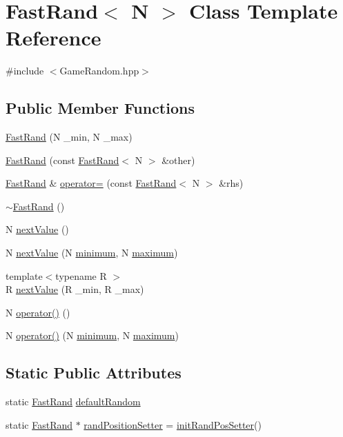 \hypertarget{class_fast_rand}{\section{Fast\-Rand$<$ N $>$ Class Template Reference}
\label{class_fast_rand}
}


{\ttfamily \#include $<$Game\-Random.\-hpp$>$}

\subsection*{Public Member Functions}
\begin{DoxyCompactItemize}
\item 
\hyperlink{class_fast_rand_a1b2acd69df1f8ebd670a133186042be4}{Fast\-Rand} (N \-\_\-min, N \-\_\-max)
\item 
\hyperlink{class_fast_rand_a51550e21d1aa8f2e4d92cac8c7466aac}{Fast\-Rand} (const \hyperlink{class_fast_rand}{Fast\-Rand}$<$ N $>$ \&other)
\item 
\hyperlink{class_fast_rand}{Fast\-Rand} \& \hyperlink{class_fast_rand_aed5b803f4e26008d1b133d7181b626ff}{operator=} (const \hyperlink{class_fast_rand}{Fast\-Rand}$<$ N $>$ \&rhs)
\item 
\hyperlink{class_fast_rand_a4acb58985ef91f01b3cb35b0aef2c5ee}{$\sim$\-Fast\-Rand} ()
\item 
N \hyperlink{class_fast_rand_a69ad4de951e5150cbde4b0775f4c029a}{next\-Value} ()
\item 
N \hyperlink{class_fast_rand_ad072e7031fed3100e5852d9e699fec53}{next\-Value} (N \hyperlink{class_fast_rand_a7041d4ec9e4da25457fe86bada8bca49}{minimum}, N \hyperlink{class_fast_rand_aaee674d6363b30ae014073e23e3b2746}{maximum})
\item 
{\footnotesize template$<$typename R $>$ }\\R \hyperlink{class_fast_rand_aae13cb1cd4178cf1cc7f6823de6110aa}{next\-Value} (R \-\_\-min, R \-\_\-max)
\item 
N \hyperlink{class_fast_rand_abc8b63cf6e5430753bcb73d83535d62f}{operator()} ()
\item 
N \hyperlink{class_fast_rand_a2c3b9991bdf5a067f42f0390571b0ddc}{operator()} (N \hyperlink{class_fast_rand_a7041d4ec9e4da25457fe86bada8bca49}{minimum}, N \hyperlink{class_fast_rand_aaee674d6363b30ae014073e23e3b2746}{maximum})
\end{DoxyCompactItemize}
\subsection*{Static Public Attributes}
\begin{DoxyCompactItemize}
\item 
static \hyperlink{class_fast_rand}{Fast\-Rand} \hyperlink{class_fast_rand_ae6756973a197860a27487b65dee1fad0}{default\-Random}
\item 
static \hyperlink{class_fast_rand}{Fast\-Rand} $\ast$ \hyperlink{class_fast_rand_aba6b711ca110b6e3ffa5aef1048cfa9b}{rand\-Position\-Setter} = \hyperlink{class_fast_rand_a32428bea0e468c24ad88e70ceac45617}{init\-Rand\-Pos\-Setter}()
\end{DoxyCompactItemize}

